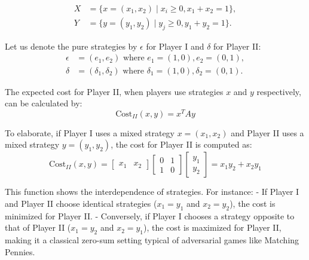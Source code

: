 \documentclass[11pt]{article}
\theoremstyle{boldStyle}
\begin{document}
\begin{equation} \label{eq:strategies}
    \begin{aligned}
        X &= \{x = (x_1, x_2) \mid x_i \geq 0, x_1 + x_2 = 1\}, \\
        Y &= \{y = (y_1, y_2) \mid y_j \geq 0, y_1 + y_2 = 1\}.
    \end{aligned}
\end{equation}

Let us denote the pure strategies by \( \epsilon \) for Player I and \( \delta \) for Player II:
\begin{equation} \label{eq:pure_strategies}
    \begin{aligned}
        \epsilon &= (e_1, e_2) \text{ where } e_1 = (1, 0), e_2 = (0, 1), \\
        \delta &= (\delta_1, \delta_2) \text{ where } \delta_1 = (1, 0), \delta_2 = (0, 1).
    \end{aligned}
\end{equation}

The expected cost for Player II, when players use strategies \( x \) and \( y \) respectively, can be calculated by:
\begin{equation} \label{eq:expected_cost}
    \text{Cost}_{II}(x, y) = x^T A y
\end{equation}

To elaborate, if Player I uses a mixed strategy \( x = (x_1, x_2) \) and Player II uses a mixed strategy \( y = (y_1, y_2) \), the cost for Player II is computed as:
\begin{equation}
    \text{Cost}_{II}(x, y) = \begin{bmatrix} x_1 & x_2 \end{bmatrix} \begin{bmatrix} 0 & 1 \\ 1 & 0 \end{bmatrix} \begin{bmatrix} y_1 \\ y_2 \end{bmatrix} = x_1 y_2 + x_2 y_1
\end{equation}

This function shows the interdependence of strategies. For instance:
- If Player I and Player II choose identical strategies (\( x_1 = y_1 \) and \( x_2 = y_2 \)), the cost is minimized for Player II.
- Conversely, if Player I chooses a strategy opposite to that of Player II (\( x_1 = y_2 \) and \( x_2 = y_1 \)), the cost is maximized for Player II, making it a classical zero-sum setting typical of adversarial games like Matching Pennies.
\end{document}
